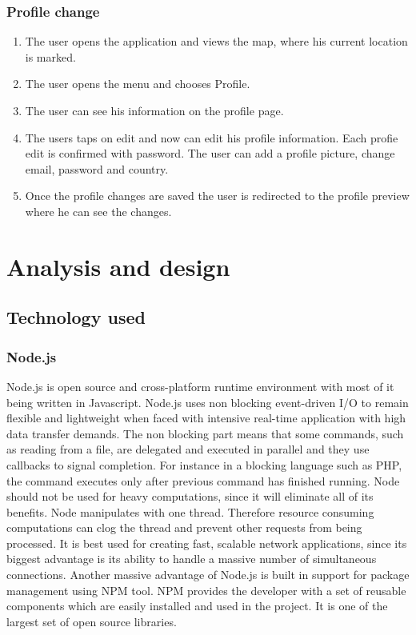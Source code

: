\documentclass[thesis=M,english]{FITthesis}[2012/10/20]
\begin{document}
\subsection{Profile change}
\begin{enumerate}
	\item The user opens the application and views the map, where his current location is marked.
	\item The user opens the menu and chooses Profile.
	\item The user can see his information on the profile page.
	\item The users taps on edit and now can edit his profile information. Each profie edit is confirmed with password. The user can add a profile picture, change email, password and country.
	\item Once the profile changes are saved the user is redirected to the profile preview where he can see the changes.
\end{enumerate}

\chapter{Analysis and design}
\section{Technology used}
\subsection{Node.js}

Node.js is open source and cross-platform runtime environment with most of it being written in Javascript. Node.js uses non blocking event-driven I/O to remain flexible and lightweight when faced with intensive real-time application with high data transfer demands.\cite{why-node} The non blocking part means that some commands, such as reading from a file, are delegated and executed in parallel and they use callbacks to signal completion. For instance in a blocking language such as PHP, the command executes only after previous command has finished running.\cite{node-benefits} Node should not be used for heavy computations, since it will eliminate all of its benefits. Node manipulates with one thread. Therefore resource consuming computations can clog the thread and prevent other requests from being processed. It is best used for creating fast, scalable network applications, since its biggest advantage is its ability to handle a massive number of simultaneous connections. Another massive advantage of Node.js is built in support for package management using NPM tool. NPM provides the developer with a set of reusable components which are easily installed and used in the project. It is one of the largest set of open source libraries.\cite{nodejs}
\end{document}
